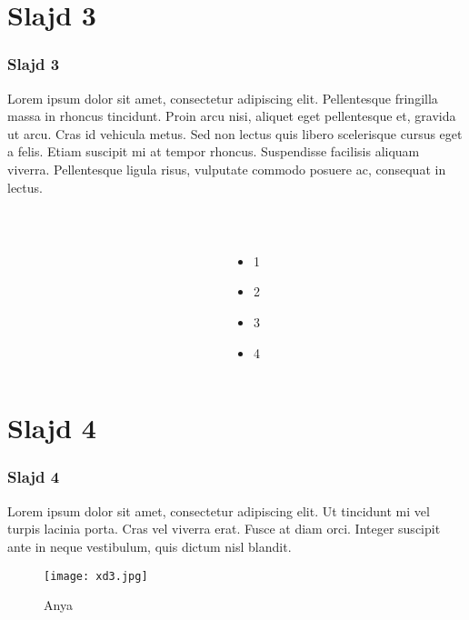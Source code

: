 \documentclass{beamer}
\begin{document}
\section{Slajd 3}
	\begin{frame}
		\frametitle{Slajd 3}
			 Lorem ipsum dolor sit amet, consectetur adipiscing elit. Pellentesque fringilla massa in rhoncus tincidunt. Proin arcu nisi, aliquet eget pellentesque et, gravida ut arcu. Cras id vehicula metus. Sed non lectus quis libero scelerisque cursus eget a felis. Etiam suscipit mi at tempor rhoncus. Suspendisse facilisis aliquam viverra. Pellentesque ligula risus, vulputate commodo posuere ac, consequat in lectus.
		\begin{columns}[t]
			\begin{column}{.7\textwidth}
				\label{fig: Anime3}
			\end{column}
			\begin{column}{.2\textwidth}
				\\\begin{itemize}
					\item 1
					\item 2
					\item 3
					\item 4
				\end{itemize}
			\end{column}
		\end{columns}
	\end{frame}

\section{Slajd 4}
	\begin{frame}
		\frametitle{Slajd 4}
        Lorem ipsum dolor sit amet, consectetur adipiscing elit. Ut tincidunt mi vel turpis lacinia porta. Cras vel viverra erat. Fusce at diam orci. Integer suscipit ante in neque vestibulum, quis dictum nisl blandit.
		\begin{figure}[H]
			\centering
			\texttt{[image: xd3.jpg]}
			\caption{Anya}
			\label{fig: Anime}
		\end{figure}
	\end{frame}
\end{document}
